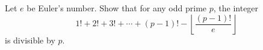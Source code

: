 \begin{problem}
    Let \( e \) be Euler's number. Show that for any odd prime \( p \), the integer
    \[
        1! + 2! + 3! + \cdots + \left(p-1\right)! - \left\lfloor \frac{\left(p-1\right)!}{e} \right\rfloor
    \]
    is divisible by \( p \).
\end{problem}
